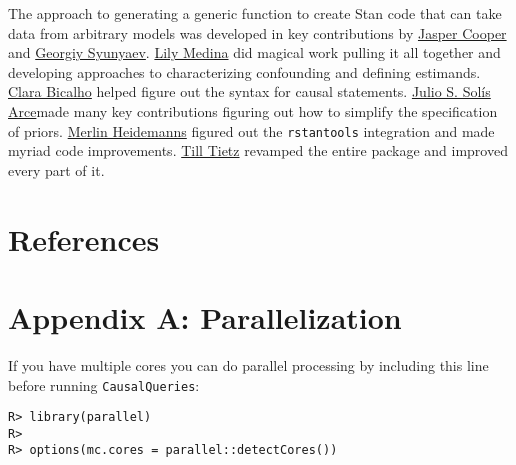 \documentclass[
  11pt,
  article]{jss}
\newlength{\cslhangindent}
\newlength{\cslentryspacingunit} %
\newenvironment{CSLReferences}[2] %
 {%
  \setlength{\parindent}{0pt}
  \ifodd #1
  \let\oldpar\par
  \def\par{\hangindent=\cslhangindent\oldpar}
  \fi
  \setlength{\parskip}{#2\cslentryspacingunit}
 }%
 {}
\begin{document}
\begin{tcolorbox}[enhanced jigsaw, leftrule=.75mm, colframe=quarto-callout-color-frame, colback=white, breakable, arc=.35mm, toprule=.15mm, left=2mm, bottomrule=.15mm, rightrule=.15mm, opacityback=0]

The approach to generating a generic function to create Stan code that
can take data from arbitrary models was developed in key contributions
by \href{http://jasper-cooper.com/}{Jasper Cooper} and
\href{http://gsyunyaev.com/}{Georgiy Syunyaev}.
\href{https://lilymedina.github.io/}{Lily Medina} did magical work
pulling it all together and developing approaches to characterizing
confounding and defining estimands.
\href{https://clarabicalho.github.io/}{Clara Bicalho} helped figure out
the syntax for causal statements.
\href{https://www.gov.harvard.edu/directory/julio-s-solis-arce/}{Julio
S. Solís Arce}made many key contributions figuring out how to simplify
the specification of priors.
\href{https://merlinheidemanns.github.io/website/}{Merlin Heidemanns}
figured out the \texttt{rstantools} integration and made myriad code
improvements. \href{https://github.com/till-tietz}{Till Tietz} revamped
the entire package and improved every part of it.

\end{tcolorbox}

\hypertarget{references}{%
\section*{References}\label{references}}

\hypertarget{refs}{}
\begin{CSLReferences}{0}{0}
\end{CSLReferences}

\newpage{}

\hypertarget{sec-parallel}{%
\section*{Appendix A: Parallelization}\label{sec-parallel}}

If you have multiple cores you can do parallel processing by including
this line before running \texttt{CausalQueries}:

\begin{verbatim}
R> library(parallel)
R> 
R> options(mc.cores = parallel::detectCores())
\end{verbatim}
\end{document}
